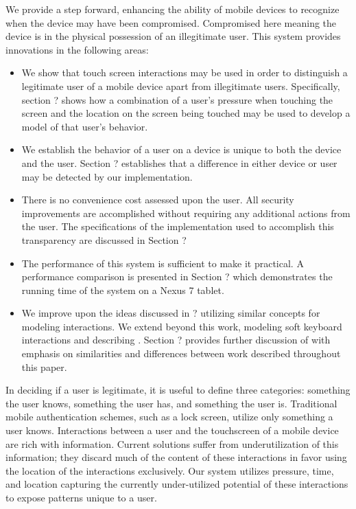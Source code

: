We provide a step forward, 
enhancing the ability of mobile devices to
recognize when the device may have been compromised.
Compromised here meaning the device is in
the physical possession of an illegitimate user.
This system provides innovations in the following areas:
\begin{itemize}
\item We show that touch screen interactions may be used in order to
  distinguish a legitimate user of a mobile device apart from
  illegitimate users.
  Specifically, section
  ? %
  shows how a combination of 
  a user's pressure when touching the screen and 
  the location on the screen being touched
  may be used to develop a model of that user's behavior.
\item We establish the behavior of a user on a device
  is unique to both the device and the user.
  Section 
  ? %
  establishes that a difference in either device or user
  may be detected by our implementation.
\item There is no convenience cost assessed upon the user.
  All security improvements are accomplished without requiring any additional
  actions from the user.
  The specifications of the implementation used to accomplish 
  this transparency are discussed in Section
  ? %
\item The performance of this system is sufficient to make it practical.
  A performance comparison is presented in Section
  ? %
  which demonstrates the running time of the system on 
  a Nexus 7 tablet.
\item We improve upon the ideas discussed in ? %
  utilizing similar concepts for modeling interactions. 
  We extend beyond this work,
  modeling soft keyboard interactions and
  describing .
  Section
  ? %
  provides further discussion of %
  with emphasis on similarities and differences
  between work described throughout this paper.
\end{itemize}

In deciding if a user is legitimate,
it is useful to define three categories:
something the user knows,
something the user has, and
something the user is.
Traditional mobile authentication schemes,
such as a lock screen,
utilize only something a user knows.
Interactions between a user
and the touchscreen of a mobile device
are rich with information.
Current solutions suffer from underutilization 
of this information; 
they discard much of the content of these
interactions in favor using
the location of the interactions exclusively.
%
Our system utilizes 
pressure,
time, and
location 
capturing the currently under-utilized potential 
of these interactions to expose patterns unique to a user.

